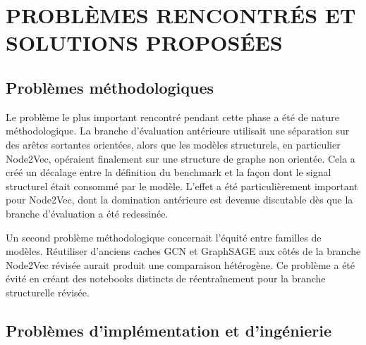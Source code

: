 \chapter{PROBLÈMES RENCONTRÉS ET SOLUTIONS PROPOSÉES}
\thispagestyle{empty}

\section{Problèmes méthodologiques}

Le problème le plus important rencontré pendant cette phase a été de nature
méthodologique. La branche d'évaluation antérieure utilisait une séparation
sur des arêtes sortantes orientées, alors que les modèles structurels, en
particulier Node2Vec, opéraient finalement sur une structure de graphe non
orientée. Cela a créé un décalage entre la définition du benchmark et la façon
dont le signal structurel était consommé par le modèle. L'effet a été
particulièrement important pour Node2Vec, dont la domination antérieure est
devenue discutable dès que la branche d'évaluation a été redessinée.

Un second problème méthodologique concernait l'équité entre familles de
modèles. Réutiliser d'anciens caches GCN et GraphSAGE aux côtés de la branche
Node2Vec révisée aurait produit une comparaison hétérogène. Ce problème a été
évité en créant des notebooks distincts de réentraînement pour la branche
structurelle révisée.

\section{Problèmes d'implémentation et d'ingénierie}


